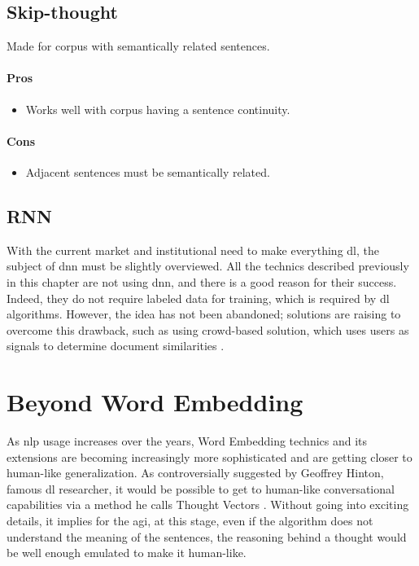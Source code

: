\subsection{Skip-thought\cite{article:skip-thought}}
Made for corpus with semantically related sentences.
\paragraph{Pros}
\begin{itemize}
    \setlength\itemsep{0em}
    \item Works well with corpus having a sentence continuity.
\end{itemize}
\paragraph{Cons}
\begin{itemize}
    \setlength\itemsep{0em}
    \item Adjacent sentences must be semantically related.
\end{itemize}

\subsection{RNN}
\label{sota:rnn}
With the current market and institutional need to make everything \gls{dl}, the subject of \gls{dnn} must be slightly overviewed. All the technics described previously in this chapter are not using \gls{dnn}, and there is a good reason for their success. Indeed, they do not require labeled data for training, which is required by \gls{dl} algorithms. However, the idea has not been abandoned; solutions are raising to overcome this drawback, such as using crowd-based solution, which uses users as signals to determine document similarities \cite{article:lstm-deep-sentence-embedding}.



\section{Beyond Word Embedding}
As \gls{nlp} usage increases over the years, Word Embedding technics and its extensions are becoming increasingly more sophisticated and are getting closer to human-like generalization. As controversially suggested by Geoffrey Hinton, famous \gls{dl} researcher, it would be possible to get to human-like conversational capabilities via a method he calls Thought Vectors \cite{article:thought2vec-geoffrey-hinton}. Without going into exciting details, it implies for the \gls{agi}, at this stage, even if the algorithm does not understand the meaning of the sentences, the reasoning behind a thought would be well enough emulated to make it human-like.

